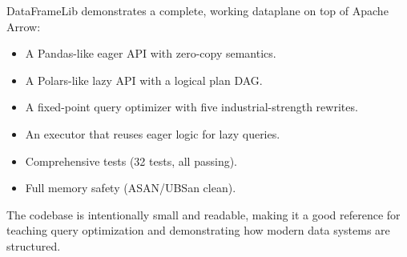 \documentclass[11pt]{article}
\begin{document}
DataFrameLib demonstrates a complete, working dataplane on top of Apache Arrow:
\begin{itemize}
  \item A Pandas-like eager API with zero-copy semantics.
  \item A Polars-like lazy API with a logical plan DAG.
  \item A fixed-point query optimizer with five industrial-strength rewrites.
  \item An executor that reuses eager logic for lazy queries.
  \item Comprehensive tests (32 tests, all passing).
  \item Full memory safety (ASAN/UBSan clean).
\end{itemize}

The codebase is intentionally small and readable, making it a good reference 
for teaching query optimization and demonstrating how modern data systems are 
structured.

\vspace{0.3in}
\end{document}
